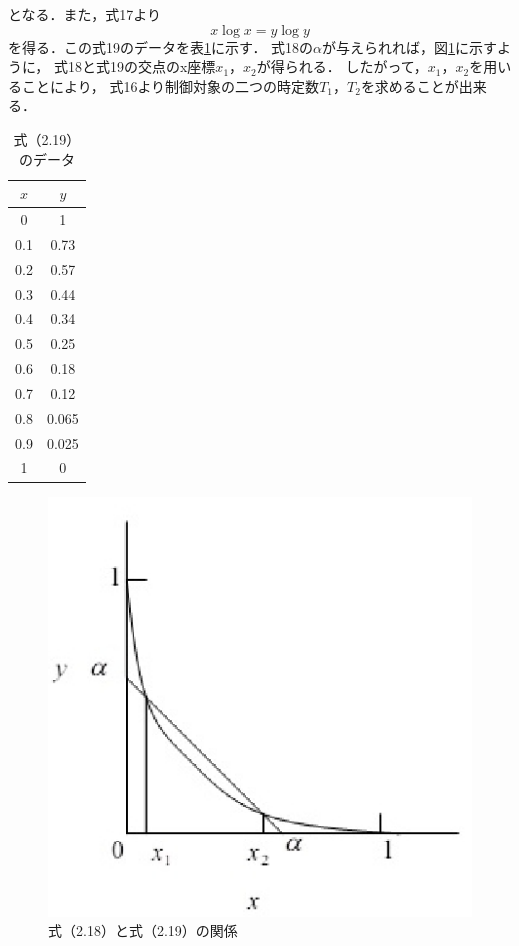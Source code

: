 \documentclass[11pt,a4paper]{jsarticle}
\begin{document}
となる．また，式17より
\begin{equation}
  x \log{x} = y \log{y}
\end{equation}
を得る．この式19のデータを表\ref{fig1}に示す．
式18の$\alpha$が与えられれば，図\ref{fig1}に示すように，
式18と式19の交点のx座標$x_1$，$x_2$が得られる．
したがって，$x_1$，$x_2$を用いることにより，
式16より制御対象の二つの時定数$T_1$，$T_2$を求めることが出来る．\\
\begin{table}[hb] 
  \begin{center}
    \caption{式（2.19）のデータ}
    \begin{tabular}{|c|c|} \hline
      $x$ & $y$   \\ \hline \hline
      0   & 1     \\ \hline
      0.1 & 0.73  \\ \hline
      0.2 & 0.57  \\ \hline
      0.3 & 0.44  \\ \hline
      0.4 & 0.34  \\ \hline
      0.5 & 0.25  \\ \hline
      0.6 & 0.18  \\ \hline
      0.7 & 0.12  \\ \hline
      0.8 & 0.065 \\ \hline
      0.9 & 0.025 \\ \hline
      1   & 0     \\ \hline
    \end{tabular}
    \label{tab:log}
  \end{center}
\end{table}

\begin{figure}[h]
  \begin{center}
    \includegraphics[width=0.5\hsize]{./img/log_relation.eps}
  \end{center}
  \caption{式（2.18）と式（2.19）の関係}
  \label{fig1}
\end{figure}
\end{document}
